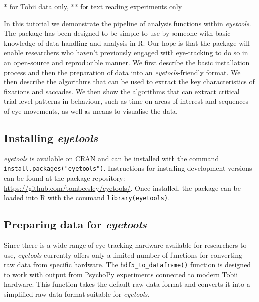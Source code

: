 \documentclass[
  man,
  floatsintext,
  longtable,
  nolmodern,
  notxfonts,
  notimes,
  colorlinks=true,linkcolor=blue,citecolor=blue,urlcolor=blue]{apa7}
\begin{document}
* for Tobii data only, ** for text reading experiments only

In this tutorial we demonstrate the pipeline of analysis functions
within \emph{eyetools}. The package has been designed to be simple to
use by someone with basic knowledge of data handling and analysis in R.
Our hope is that the package will enable researchers who haven't
previously engaged with eye-tracking to do so in an open-source and
reproducible manner. We first describe the basic installation process
and then the preparation of data into an \emph{eyetools}-friendly
format. We then describe the algorithms that can be used to extract the
key characteristics of fixations and saccades. We then show the
algorithms that can extract critical trial level patterns in behaviour,
such as time on areas of interest and sequences of eye movements, as
well as means to visualise the data.

\subsection{\texorpdfstring{Installing
\emph{eyetools}}{Installing eyetools}}\label{installing-eyetools}

\emph{eyetools} is available on CRAN and can be installed with the
command \texttt{install.packages("eyetools")}. Instructions for
installing development versions can be found at the package repository:
\url{https://github.com/tombeesley/eyetools/}. Once installed, the
package can be loaded into R with the command
\texttt{library(eyetools)}.

\subsection{\texorpdfstring{Preparing data for
\emph{eyetools}}{Preparing data for eyetools}}\label{preparing-data-for-eyetools}

Since there is a wide range of eye tracking hardware available for
researchers to use, \emph{eyetools} currently offers only a limited
number of functions for converting raw data from specific hardware. The
\texttt{hdf5\_to\_dataframe()} function is designed to work with output
from PsychoPy experiments connected to modern Tobii hardware. This
function takes the default raw data format and converts it into a
simplified raw data format suitable for \emph{eyetools}.
\end{document}
